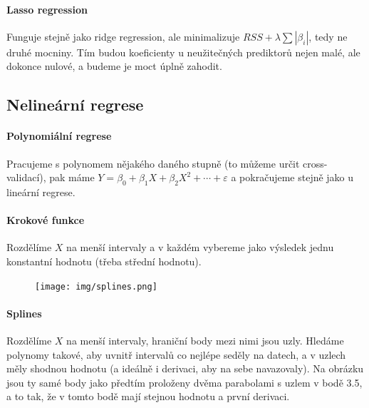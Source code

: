 \documentclass[10pt,a4paper]{article}
\begin{document}
\paragraph{Lasso regression} Funguje stejně jako ridge regression, ale minimalizuje $RSS + \lambda\sum|\beta_i|$, tedy ne druhé mocniny. Tím budou koeficienty u neužitečných prediktorů nejen malé, ale dokonce nulové, a budeme je moct úplně zahodit.

\subsection{Nelineární regrese}

\paragraph{Polynomiální regrese} Pracujeme s polynomem nějakého daného stupně (to můžeme určit cross-validací), pak máme $Y = \beta_0 + \beta_1 X + \beta_2 X^2 + \cdots + \varepsilon$ a pokračujeme stejně jako u lineární regrese.

\paragraph{Krokové funkce} Rozdělíme $X$ na menší intervaly a v každém vybereme jako výsledek jednu konstantní hodnotu (třeba střední hodnotu). 

\begin{figure}[ht!]
\centering
\texttt{[image: img/splines.png]}
\end{figure}

\paragraph{Splines} Rozdělíme $X$ na menší intervaly, hraniční body mezi nimi jsou uzly. Hledáme polynomy takové, aby uvnitř intervalů co nejlépe seděly na datech, a v uzlech měly shodnou hodnotu  (a ideálně i derivaci, aby na sebe navazovaly). Na obrázku jsou ty samé body jako předtím proloženy dvěma parabolami s uzlem v bodě 3.5, a to tak, že v tomto bodě mají stejnou hodnotu a první derivaci.
\end{document}
